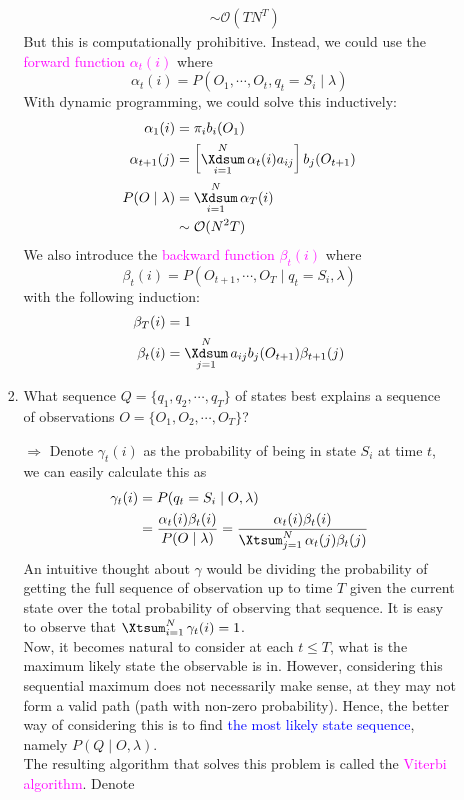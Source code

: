\documentclass[UTF8]{book}
\DeclareMathOperator*{\Xsum}{\mathchoice{\Xdsum}{\Xtsum}{\Xtsum}{\Xtsum}}
\newcommand{\et}{&}
\newcommand{\f}{^2}
\newcommand{\concept}[1]{\textcolor{magenta}{#1}}
\renewcommand{\emph}[1]{\textcolor{blue}{#1}}
\begin{document}
\begin{itemize}
\begin{itemize}
\begin{enumerate}
\begin{align*}
			\et \sim \mathcal{O}(TN^T)
		\end{align*}
		But this is computationally prohibitive. Instead, we could use the \concept{forward function $\alpha_t(i)$} where
		$$
		\alpha_t(i) = P(O_1,\cdots,O_t,q_t=S_i\mid\lambda)		
		$$
		With dynamic programming, we could solve this inductively:
		\begin{align*}
			\alpha_1(i) \et = \pi_i b_i (O_1)\\
			\alpha_{t+1}(j) \et = \left[\Xsum_{i=1}^N\alpha_t(i)a_{ij}\right]b_j(O_{t+1})\\
			P(O\mid\lambda) \et = \Xsum_{i=1}^N\alpha_T(i)\\
			\et \sim \mathcal{O}(N\f T)
		\end{align*}
		We also introduce the \concept{backward function $\beta_t(i)$} where
		$$
					\beta_t(i) = P(O_{t+1},\cdots,O_T\mid q_t=S_i,\lambda)		
		$$
		with the following induction:
		\begin{align*}
			\beta_T(i) \et = 1\\
			\beta_t(i) \et = \Xsum_{j=1}^N a_{ij}b_j(O_{t+1})\beta_{t+1}(j)
		\end{align*}
		\item What sequence $Q = \{q_1,q_2,\cdots,q_T\}$ of states best explains a sequence of observations $O = \{O_1,O_2,\cdots,O_T\}$?
		\item[$\Rightarrow$] Denote $\gamma_t(i)$ as the probability of being in state $S_i$ at time $t$, we can easily calculate this as
		\begin{align*}
			\gamma_t(i) \et = P(q_t = S_i\mid O,\lambda)	\\
			\et = \dfrac{\alpha_t(i)\beta_t(i)}{P(O\mid\lambda)} = \dfrac{\alpha_t(i)\beta_t(i)}{\Xsum_{j=1}^N\alpha_t(j)\beta_t(j)}
		\end{align*}
		An intuitive thought about $\gamma$ would be dividing the probability of getting the full sequence of observation up to time $T$ given the current state over the total probability of observing that sequence. It is easy to observe that $\Xsum_{i=1}^N\gamma_t(i) = 1$.\\
		Now, it becomes natural to consider at each $t\leq T$, what is the maximum likely state the observable is in. However, considering this sequential maximum does not necessarily make sense, at they may not form a valid path (path with non-zero probability). Hence, the better way of considering this is to find \emph{the most likely state sequence}, namely $P(Q\mid O,\lambda)$.\\
		The resulting algorithm that solves this problem is called the \concept{Viterbi algorithm}. Denote

\end{enumerate}
\end{itemize}
\end{itemize}
\end{document}
